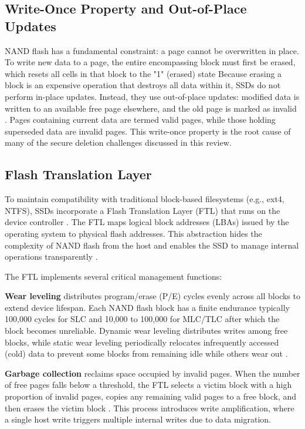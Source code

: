 \subsection{Write-Once Property and Out-of-Place Updates}
NAND flash has a fundamental constraint: a page cannot be overwritten in place. To write new data to a 
page, the entire encompassing block must first be erased, which resets all cells in that block to the 
"1" (erased) state \cite{aronsson2025secure} Because erasing a block is an expensive operation that 
destroys all data within it, SSDs do not perform in-place updates. Instead, they use out-of-place 
updates: modified data is written to an available free page elsewhere, and the old page is marked 
as invalid \cite{zhang2018ensuring}. Pages containing current data are termed valid pages, while 
those holding superseded data are invalid pages. This write-once property is the root cause of many 
of the secure deletion challenges discussed in this review.

\subsection{Flash Translation Layer}
To maintain compatibility with traditional block-based filesystems (e.g., ext4, NTFS), SSDs 
incorporate a Flash Translation Layer (FTL) that runs on the device controller \cite{aronsson2025secure}.
The FTL maps logical block addresses (LBAs) issued by the operating system to physical flash 
addresses. This abstraction hides the complexity of NAND flash from the host and enables the 
SSD to manage internal operations transparently \cite{duplicateschen2022}.

The FTL implements several critical management functions:

\textbf{Wear leveling} distributes program/erase (P/E) cycles evenly across all blocks to extend 
device lifespan. Each NAND flash block has a finite endurance typically 100,000 cycles for SLC 
and 10,000 to 100,000 for MLC/TLC after which the block becomes unreliable. Dynamic wear leveling 
distributes writes among free blocks, while static wear leveling periodically relocates infrequently 
accessed (cold) data to prevent some blocks from remaining idle while others wear out \cite{homaidi2009data}.

\textbf{Garbage collection} reclaims space occupied by invalid pages. When the number of free pages falls 
below a threshold, the FTL selects a victim block with a high proportion of invalid pages, copies any 
remaining valid pages to a free block, and then erases the victim block \cite{aronsson2025secure,duplicateschen2022}.
This process introduces write amplification, where a single host write triggers multiple internal writes 
due to data migration.

